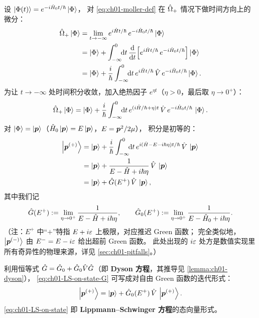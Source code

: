 设 $\ket{\Phi(t)} = e^{-i\hat{H}_0 t/\hbar} \ket{\Phi}$，
对 \cref{eq:ch01-moller-def} 在 $\hat{\Omega}_{+}$ 情况下做时间方向上的微分：
\begin{align}
  \hat{\Omega}_{+} \ket{\Phi}
  &= \lim_{t \to -\infty} e^{i\hat{H} t/\hbar}\, e^{-i\hat{H}_0 t/\hbar} \ket{\Phi}                            \notag \\
  &= \ket{\Phi}
     + \int_{-\infty}^{0}\!\!\dd t\,
        \dv{t}\!\left[ e^{i\hat{H} t/\hbar}\, e^{-i\hat{H}_0 t/\hbar} \right] \ket{\Phi}                       \notag \\
  &= \ket{\Phi}
     + \frac{i}{\hbar} \int_{-\infty}^{0}\!\!\dd t\,
        e^{i\hat{H} t/\hbar}\, \hat{V}\, e^{-i\hat{H}_0 t/\hbar} \ket{\Phi}.
  \label{eq:ch01-moller-deriv}
\end{align}
为让 $t \to -\infty$ 处时间积分收敛，加入绝热因子 $e^{\eta t}$（$\eta > 0$，最后取 $\eta \to 0^+$）：
\begin{equation}
  \hat{\Omega}_{+} \ket{\Phi}
  = \ket{\Phi}
    + \frac{i}{\hbar} \int_{-\infty}^{0}\!\!\dd t\,
       e^{(i\hat{H}/\hbar + \eta) t}\, \hat{V}\, e^{-i\hat{H}_0 t/\hbar}\, \ket{\Phi}.
  \label{eq:ch01-moller-adia}
\end{equation}
对 $\ket{\Phi} = \ket{\bm{p}}$（$\hat{H}_0 \ket{\bm{p}} = E \ket{\bm{p}}$，$E = \bm{p}^2/2\mu$），
积分是初等的：
\begin{align}
  \ket{\bm{p}^{(+)}}
  &= \ket{\bm{p}}
    + \frac{i}{\hbar} \int_{-\infty}^{0}\!\!\dd t\,
       e^{i(\hat{H} - E - i\hbar\eta) t/\hbar}\, \hat{V}\, \ket{\bm{p}}                                    \notag \\
  &= \ket{\bm{p}}
    + \frac{1}{E - \hat{H} + i\hbar\eta}\, \hat{V}\, \ket{\bm{p}}                                          \notag \\
  &= \ket{\bm{p}} + \hat{G}(E^+)\, \hat{V}\, \ket{\bm{p}},
  \label{eq:ch01-LS-on-state-G}
\end{align}
其中我们记
\begin{equation}
  \hat{G}(E^+) := \lim_{\eta \to 0^+} \frac{1}{E - \hat{H} + i\hbar\eta},
  \qquad
  \hat{G}_0(E^+) := \lim_{\eta \to 0^+} \frac{1}{E - \hat{H}_0 + i\hbar\eta}.
  \label{eq:ch01-Gdef}
\end{equation}
（注：$E^+$ 中“$+$”特指 $E + i\varepsilon$ 上极限，对应推迟 Green 函数；
完全类似地，$\ket{\bm{p}^{(-)}}$ 由 $E^- = E - i\varepsilon$ 给出超前 Green 函数。
此处出现的 $i\varepsilon$ 处方是数值实现里所有奇异性的物理来源，详见 \cref{sec:ch01-pitfalls}。）

利用恒等式 $\hat{G} = \hat{G}_0 + \hat{G}_0 \hat{V} \hat{G}$（即 \textbf{Dyson 方程}，其推导见 \cref{lemma:ch01-dyson}），
\cref{eq:ch01-LS-on-state-G} 可写成对自由 Green 函数的迭代形式：
\begin{equation}
  \ket{\bm{p}^{(+)}} = \ket{\bm{p}} + \hat{G}_0(E^+)\, \hat{V}\, \ket{\bm{p}^{(+)}}.
  \label{eq:ch01-LS-on-state}
\end{equation}
\cref{eq:ch01-LS-on-state} 即\textbf{ Lippmann--Schwinger 方程}的态向量形式。

